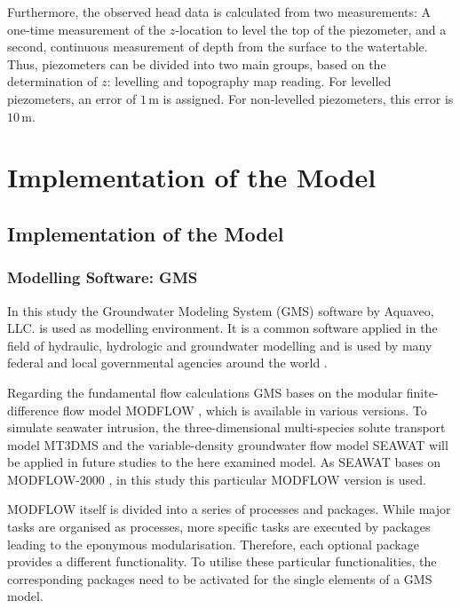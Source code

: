 Furthermore, the observed head data is calculated from two measurements: A one-time measurement of the $z$-location to level the top of the piezometer, and a second, continuous measurement of depth from the surface to the watertable. Thus, piezometers can be divided into two main groups, based on the determination of $z$: levelling and topography map reading. For levelled piezometers, an error of $1 \, \textrm{m}$ is assigned. For non-levelled piezometers, this error is $10 \, \textrm{m}$.


\chapter{Implementation of the Model}
\label{Chap-ImplMod}


\section{Implementation of the Model}

\subsection{Modelling Software: GMS}
\label{Sec-GMS}

In this study the Groundwater Modeling System (GMS) software by Aquaveo, LLC. is used as modelling environment. It is a common software applied in the field of hydraulic, hydrologic and groundwater modelling and is used by many federal and local governmental agencies around the world \parencite{Aquaveo.2021}.

Regarding the fundamental flow calculations GMS bases on the modular finite-difference flow model MODFLOW \parencite{McDonald.1988}, which is available in various versions. To simulate seawater intrusion, the three-dimensional multi-species solute transport model MT3DMS \parencite{Zheng.1999} and the variable-density groundwater flow model SEAWAT \parencite{Langevin.2009} will be applied in future studies to the here examined model. As SEAWAT bases on MODFLOW-2000 \parencite{Harbaugh.2000}, in this study this particular MODFLOW version is used.

MODFLOW itself is divided into a series of processes and packages. While major tasks are organised as processes, more specific tasks are executed by packages leading to the eponymous modularisation. Therefore, each optional package provides a different functionality. To utilise these particular functionalities, the corresponding packages need to be activated for the single elements of a GMS model.

